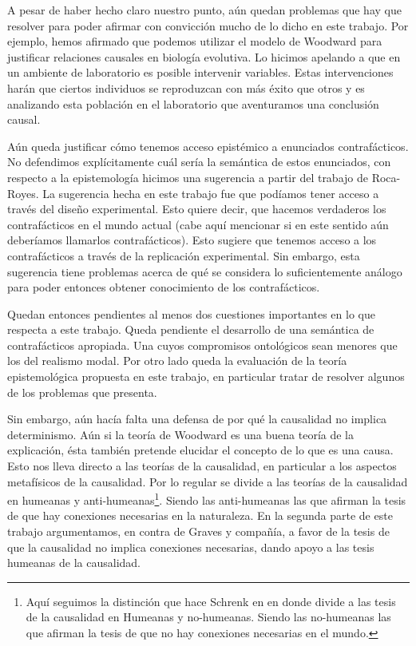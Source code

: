 A pesar de haber hecho claro nuestro punto, aún quedan problemas que hay que resolver para poder afirmar con convicción mucho de lo dicho en este trabajo. Por ejemplo, hemos afirmado que podemos utilizar el modelo de Woodward para justificar relaciones causales en biología evolutiva. Lo hicimos apelando a que en un ambiente de laboratorio es posible intervenir variables. Estas intervenciones harán que ciertos individuos se reproduzcan con más éxito que otros y es analizando esta población en el laboratorio que aventuramos una conclusión causal.

Aún queda justificar cómo tenemos acceso epistémico a enunciados contrafácticos. No defendimos explícitamente cuál sería la semántica de estos enunciados, con respecto a la epistemología hicimos una sugerencia a partir del trabajo de  Roca-Royes. La sugerencia hecha en este trabajo fue que podíamos tener acceso a través del diseño experimental. Esto quiere decir, que hacemos verdaderos los contrafácticos en el mundo actual (cabe aquí mencionar si en este sentido aún deberíamos llamarlos contrafácticos). Esto sugiere que tenemos acceso a los contrafácticos a través de la replicación experimental. Sin embargo, esta sugerencia tiene problemas acerca de qué se considera lo suficientemente análogo para poder entonces obtener conocimiento de los contrafácticos.

Quedan entonces pendientes al menos dos cuestiones importantes en lo que respecta a este trabajo. Queda pendiente el desarrollo de una semántica de contrafácticos apropiada. Una cuyos compromisos ontológicos sean menores que los del realismo modal. Por otro lado queda la evaluación de la teoría epistemológica propuesta en este trabajo, en particular tratar de resolver algunos de los problemas que presenta.

Sin embargo, aún hacía falta una defensa de por qué la causalidad no implica determinismo. Aún si la teoría de Woodward es una buena teoría de la explicación, ésta también pretende elucidar el concepto de lo que es una causa. Esto nos lleva directo a las teorías de la causalidad, en particular a los aspectos metafísicos de la causalidad. Por lo regular se divide a las teorías de la causalidad en humeanas y anti-humeanas\footnote{Aquí seguimos la distinción que hace Schrenk en \citeyear{Schrenk2017} en donde divide a las tesis de la causalidad en Humeanas y no-humeanas. Siendo las no-humeanas las que afirman la tesis de que no hay conexiones necesarias en el mundo.}. Siendo las anti-humeanas las que afirman la tesis de que hay conexiones necesarias en la naturaleza. En la segunda parte de este trabajo argumentamos, en contra de Graves y compañía, a favor de la tesis de que la causalidad no implica conexiones necesarias, dando apoyo a las tesis humeanas de la causalidad.

